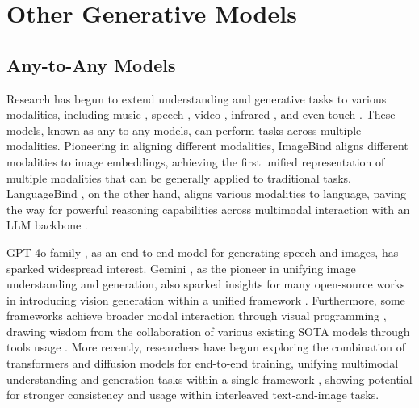 \clearpage
\section{Other Generative Models}
\label{sec:others}

\subsection{Any-to-Any Models}

Research has begun to extend understanding and generative tasks to various modalities, including music \citep{fei2024flux}, speech \citep{shu2023llasm}, video \citep{chen2024panda}, infrared \citep{gao2016infar}, and even touch \citep{fu2024touch}. These models, known as any-to-any models, can perform tasks across multiple modalities. Pioneering in aligning different modalities, ImageBind \citep{han2023imagebind} aligns different modalities to image embeddings, achieving the first unified representation of multiple modalities that can be generally applied to traditional tasks. LanguageBind \citep{zhu2023languagebind}, on the other hand, aligns various modalities to language, paving the way for powerful reasoning capabilities across multimodal interaction with an LLM backbone \citep{zhu2024llmbind,girdhar2023imagebind,wu2023next, zhan2024anygpt, tang2024codi,li2024mini}.

GPT-4o family \citep{openai_gpt4o_system_card, openai2024gpt4omini}, as an end-to-end model for generating speech and images, has sparked widespread interest. Gemini \citep{team2023gemini}, as the pioneer in unifying image understanding and generation, also sparked insights for many open-source works in introducing vision generation within a unified framework \citep{li2024mini, chen2024interleaved}. Furthermore, some frameworks achieve broader modal interaction through visual programming \citep{gupta2023visual, suris2023vipergpt}, drawing wisdom from the collaboration of various existing SOTA models through tools usage \citep{ma2024m, hu2024visual, liu2023llava}. More recently, researchers have begun exploring the combination of transformers and diffusion models for end-to-end training, unifying multimodal understanding and generation tasks within a single framework \citep{zhou2024transfusion, xie2024show, team2024chameleon, chern2024anole, koh2024generating, li2024mini, wu2023next}, showing potential for stronger consistency and usage within interleaved text-and-image tasks.


